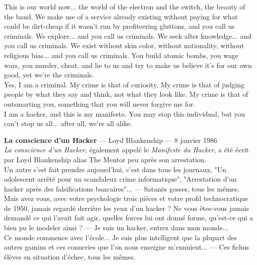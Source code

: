 \documentclass[11pt,twoside,a4paper]{book}
\begin{document}
\begin{minipage}[h]{0.95\textwidth}
	This is our world now... the world of the electron and the switch, the beauty of the baud. We make use of a service already existing without paying for what could be dirt-cheap if it wasn't run by profiteering gluttons, and you call us criminals. We explore... and you call us criminals. We seek after knowledge... and you call us criminals. We exist without skin color, without nationality, without religious bias... and you call us criminals. You build atomic bombs, you wage wars, you murder, cheat, and lie to us and try to make us believe it's for our own good, yet we're the criminals.~\\
	
	Yes, I am a criminal. My crime is that of curiosity. My crime is that of judging people by what they say and think, not what they look like. My crime is that of outsmarting you, something that you will never forgive me for.~\\
	
	I am a hacker, and this is my manifesto. You may stop this individual, but you can't stop us all... after all, we're all alike. %
\end{minipage}

\clearpage

\textbf{\large La conscience d'un Hacker} --- Loyd Blankenship --- 8 janvier 1986 ~\\
{\scriptsize \emph{La conscience d'un Hacker}, {\'e}galement appel{\'e} le \emph{Manifeste du Hacker}, a {\'e}t{\'e} {\'e}crit par Loyd Blankenship alias The Mentor peu apr{\`e}s son arrestation. } ~\\

Un autre s'est fait prendre aujourd'hui, c'est dans tous les journaux. "Un adolescent arr{\^e}t{\'e} pour un scandaleux crime informatique", "Arrestation d'un hacker apr{\`e}s des falsifications bancaires"... --- Satan{\'e}s gosses, tous les m{\^e}mes. ~\\

Mais avez vous, avec votre psychologie trois pi{\`e}ces et votre profil technocratique de 1950, jamais regard{\'e} derri{\`e}re les yeux d'un hacker ? Ne vous {\^e}tes-vous jamais demand{\'e} ce qui l'avait fait agir, quelles forces lui ont donn{\'e} forme, qu'est-ce qui a bien pu le modeler ainsi ? --- Je suis un hacker, entrez dans mon monde... ~\\
Ce monde commence avec l'{\'e}cole... Je suis plus intelligent que la plupart des autres gamins et ces conneries que l'on nous enseigne m'ennuient... --- Ces fichus {\'e}l{\`e}ves en situation d'{\'e}chec, tous les m{\^e}mes. ~\\
\end{document}
